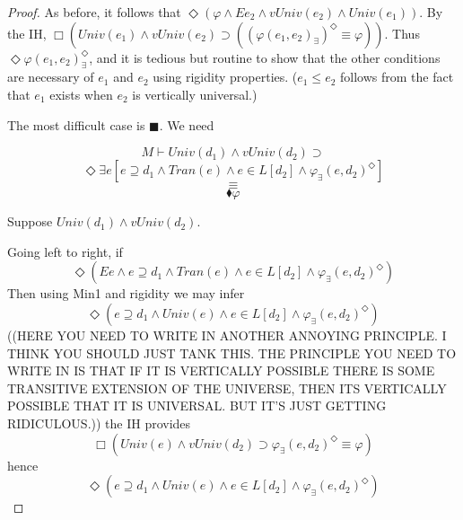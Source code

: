 \documentclass{article}
\newcommand\D{\blacklozenge}
\newcommand\B{\blacksquare}
\begin{document}
\begin{proof}
        As before, it follows that $\Diamond (\varphi \wedge Ee_2 \wedge vUniv(e_2) \wedge Univ(e_1))$. By the IH, 
        $\Box (Univ(e_1) \wedge vUniv(e_2) \supset ((\varphi(e_1, e_2)_\exists)^\Diamond \equiv \varphi))$.  Thus 
        $\Diamond \varphi(e_1, e_2)_\exists^\Diamond$, and it is tedious but routine to show that the other 
        conditions are necessary of $e_1$ and $e_2$ using rigidity properties. ($e_1 \leq e_2$ follows 
        from the fact that $e_1$ exists when $e_2$ is vertically universal.)
    
        The most difficult case is $\B$. We need
    
        $$M \vdash Univ(d_1) \wedge vUniv(d_2) \supset $$
        $$\Diamond \exists e[e \supseteq d_1 \wedge Tran(e) \wedge e \in L[d_2] \wedge \varphi_\exists(e, d_2)^\Diamond]$$
        $$\equiv $$
        $$\D \varphi$$

        Suppose $Univ(d_1) \wedge vUniv(d_2)$.

        Going left to right, if 
        $$\Diamond (Ee \wedge e \supseteq d_1 \wedge Tran(e) \wedge e \in L[d_2] \wedge \varphi_\exists(e, d_2)^\Diamond)$$
        Then using Min1 and rigidity we may infer 
        $$\Diamond ( e \supseteq d_1 \wedge Univ(e) \wedge e \in L[d_2] \wedge \varphi_\exists(e, d_2)^\Diamond)$$
        ((HERE YOU NEED TO WRITE IN ANOTHER ANNOYING PRINCIPLE. I THINK YOU SHOULD JUST TANK THIS.
        THE PRINCIPLE YOU NEED TO WRITE IN IS THAT IF IT IS VERTICALLY POSSIBLE THERE IS SOME TRANSITIVE 
        EXTENSION OF THE UNIVERSE, THEN ITS VERTICALLY POSSIBLE THAT IT IS UNIVERSAL.
        BUT IT'S JUST GETTING RIDICULOUS.))
        the IH provides 
        $$\Box (Univ(e) \wedge vUniv(d_2) \supset \varphi_\exists(e, d_2)^\Diamond \equiv \varphi)$$
        hence 
        $$\Diamond ( e \supseteq d_1 \wedge Univ(e) \wedge e \in L[d_2] \wedge \varphi_\exists(e, d_2)^\Diamond)$$



    \end{proof}
    
\end{document}
